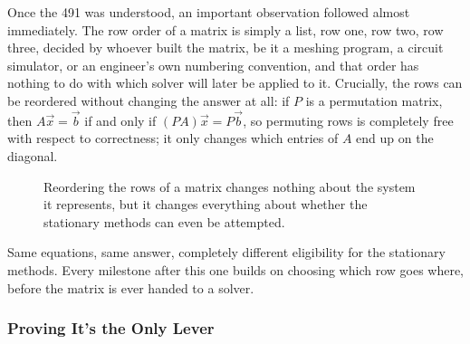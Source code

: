 \documentclass[11pt,a4paper]{article}
\begin{document}
\label{sec:novel-idea}
Once the 491 was understood, an important observation followed almost immediately. The
row order of a matrix is simply a list, row one, row two, row three, decided by whoever
built the matrix, be it a meshing program, a circuit simulator, or an engineer's own
numbering convention, and that order has nothing to do with which solver will later be
applied to it. Crucially, the rows can be reordered without changing the answer at all:
if $P$ is a permutation matrix, then $A\vec{x}=\vec{b}$ if and only if
$(PA)\vec{x} = P\vec{b}$, so permuting rows is completely free with respect to
correctness; it only changes which entries of $A$ end up on the diagonal.

\begin{figure}[H]
\centering
{}
\caption{Reordering the rows of a matrix changes nothing about the system it represents,
but it changes everything about whether the stationary methods can even be attempted.}
\label{fig:diagonal-swap}
\end{figure}

Same equations, same answer, completely different eligibility for the stationary methods.
Every milestone after this one builds on choosing which row goes where, before the matrix
is ever handed to a solver.

\subsubsection{Proving It's the Only Lever}
\label{sec:novel-proof}
\end{document}
